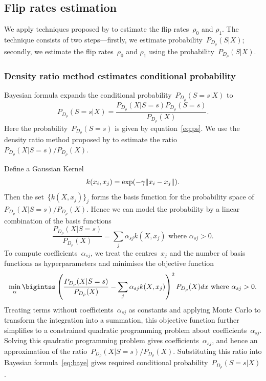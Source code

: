 \documentclass[12pt]{article} %
\DeclarePairedDelimiter{\norm}{\lVert}{\rVert}
\begin{document}
\subsection{Flip rates estimation}\label{method2}
We apply techniques proposed by \citet{liu2016classification} to estimate the flip rates~$\rho_0$ and $\rho_1$. The technique consists of two steps---firstly, we estimate probability~$P_{D_\rho}(S|X)$; secondly, we estimate the flip rates~$\rho_0$ and $\rho_1$ using the probability~$P_{D_\rho}(S|X)$. 



\subsubsection{Density ratio method estimates conditional probability}\label{method22}
Bayesian formula expands the conditional probability~$P_{D_\rho}(S=s|X)$ to
\begin{equation}
   P_{D_\rho}(S=s|X)=\frac{P_{D_\rho}(X|S=s)P_{D_\rho}(S=s)}{P_{D_\rho}(X)}.\label{eq:baye}
\end{equation}
Here the probability~$P_{D_\rho}(S=s)$ is given by equation~\eqref{eq:ps}. We use the density ratio method proposed by \citet{DBLP:journals/jmlr/KanamoriHS09} to estimate the ratio~${P_{D_\rho}(X|S=s)}/{P_{D_\rho}(X)}$.

Define a Gaussian Kernel 
\begin{equation}\label{eq:gauss}
k(x_i,x_j)=\exp(-\gamma\norm{x_i-x_j}).
\end{equation} 
Then the set~$\{k(X,x_j) \}_j$ forms the basis function for the probability space of ${P_{D_\rho}(X|S=s)}/{P_{D_\rho}(X)}$. Hence we can model the probability by a linear combination of the basis functions
\begin{equation*}
   \frac{P_{D_\rho}(X|S=s)}{P_{D_\rho}(X)}=\sum_j \alpha_{sj} k(X,x_j) \text{ where }\alpha_{sj}>0.%
\end{equation*}
To compute coefficients~$\alpha_{sj}$, we treat the centres~$x_j$ and the number of basis functions as hyperparameters and minimises the objective function
\begin{equation*}
  \min_\alpha \bigintss \left(\frac{P_{D_\rho}(X|S=s)}{P_{D_\rho}(X)}-\sum_j \alpha_{sj} k(X,x_j)\right)^2P_{D_\rho}(X)dx \text{ where }\alpha_{sj}>0.
\end{equation*}
Treating terms without coefficients~$\alpha_{sj}$ as constants and applying Monte Carlo to transform the integration into a summation, this objective function further simplifies to a constrained quadratic programming problem about coefficients~$\alpha_{sj}$. Solving this quadratic programming problem gives coefficients~$\alpha_{sj}$, and hence an approximation of the ratio~${P_{D_\rho}(X|S=s)}/{P_{D_\rho}(X)}$. Substituting this ratio into Bayesian formula~\eqref{eq:baye} gives required conditional probability~$P_{D_\rho}(S=s|X)$.
\end{document}
